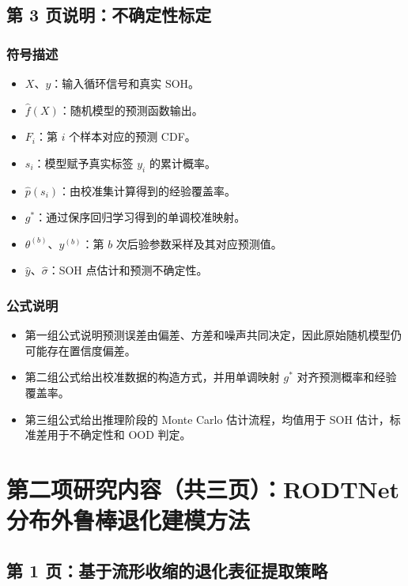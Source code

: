 ﻿\documentclass[UTF8,a4paper,10pt]{ctexart}
\begin{document}
\clearpage
\subsection*{第 3 页说明：不确定性标定}
\subsubsection*{符号描述}
\begin{itemize}
  \item $X$、$y$：输入循环信号和真实 SOH。
  \item $\hat f(X)$：随机模型的预测函数输出。
  \item $F_i$：第 $i$ 个样本对应的预测 CDF。
  \item $s_i$：模型赋予真实标签 $y_i$ 的累计概率。
  \item $\hat p(s_i)$：由校准集计算得到的经验覆盖率。
  \item $g^*$：通过保序回归学习得到的单调校准映射。
  \item $\theta^{(b)}$、$y^{(b)}$：第 $b$ 次后验参数采样及其对应预测值。
  \item $\hat y$、$\hat\sigma$：SOH 点估计和预测不确定性。
\end{itemize}
\subsubsection*{公式说明}
\begin{itemize}
  \item 第一组公式说明预测误差由偏差、方差和噪声共同决定，因此原始随机模型仍可能存在置信度偏差。
  \item 第二组公式给出校准数据的构造方式，并用单调映射 $g^*$ 对齐预测概率和经验覆盖率。
  \item 第三组公式给出推理阶段的 Monte Carlo 估计流程，均值用于 SOH 估计，标准差用于不确定性和 OOD 判定。
\end{itemize}

\clearpage
\section{第二项研究内容（共三页）：RODTNet 分布外鲁棒退化建模方法}

\subsection{第 1 页：基于流形收缩的退化表征提取策略}
\end{document}
